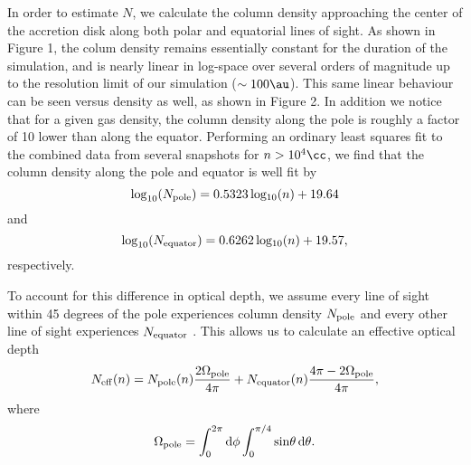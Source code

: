 In order to estimate $N$, we calculate the column density approaching the center of the accretion disk along both polar and equatorial lines of sight. As shown in Figure 1, the colum density remains essentially constant for the duration of the simulation, and is nearly linear in log-space over several orders of magnitude up to the resolution limit of our simulation
($\sim100\au$). This same linear behaviour can be seen versus density as well, as shown in Figure 2. In addition we notice that for a given gas density, the column density along the pole is roughly a factor of 10 lower than along the equator.  Performing an ordinary least squares fit to the combined data from several snapshots for $n > 10^4\cc$, we find that the column density along the pole and equator is well fit by 
\begin{equation}
{\rm log}_{10}(N_{\rm \small pole}) = 0.5323\, {\rm log_{10}}(n) + 19.64
\end{equation}
and
\begin{equation}
{\rm log}_{10}(N_{\rm \small equator}) = 0.6262\, {\rm log_{10}}(n) + 19.57, 
\end{equation}
respectively.

To account for this difference in optical depth, we assume every line of sight within 45 degrees of the pole experiences column density $N_{\rm \small pole}$ and every other line of sight experiences $N_{\rm \small equator}$ \citep{Hosokawaetal2011}. This allows us to calculate an effective optical depth
\begin{equation}
N_{\rm \small eff}(n) = N_{\rm \small pole}(n) \frac{2 \Omega_{\rm \small pole}}{4\pi} + N_{\rm \small equator}(n) \frac{4\pi - 2 \Omega_{\rm \small pole}}{4\pi},
\end{equation}
where
\begin{equation}
\Omega_{\rm \small pole} = \int_0^{2\pi}{\rm d}\phi \int_0^{\pi/4}{\rm sin}\theta \,{\rm d}\theta.
\end{equation}